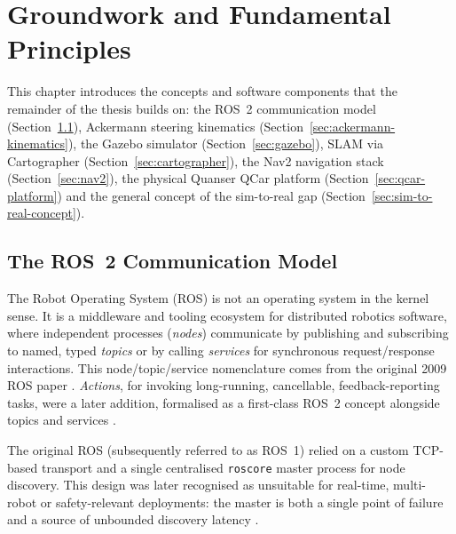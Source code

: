 \chapter{Groundwork and Fundamental Principles}
\label{ch:groundwork}


This chapter introduces the concepts and software components that the
remainder of the thesis builds on: the ROS~2 communication model
(Section~\ref{sec:ros2-model}), Ackermann steering kinematics
(Section~\ref{sec:ackermann-kinematics}), the Gazebo simulator
(Section~\ref{sec:gazebo}), SLAM via Cartographer
(Section~\ref{sec:cartographer}), the Nav2 navigation stack
(Section~\ref{sec:nav2}), the physical Quanser QCar platform
(Section~\ref{sec:qcar-platform}) and the general concept of the
sim-to-real gap (Section~\ref{sec:sim-to-real-concept}).

\section{The ROS~2 Communication Model}
\label{sec:ros2-model}

The Robot Operating System (ROS) is not an operating system in the
kernel sense. It is a middleware and tooling ecosystem for distributed
robotics software, where independent processes (\emph{nodes})
communicate by publishing and subscribing to named, typed
\emph{topics} or by calling \emph{services} for synchronous
request/response interactions. This node/topic/service nomenclature
comes from the original 2009 ROS paper \cite{quigley2009ros}. \emph{Actions},
for invoking long-running, cancellable, feedback-reporting tasks,
were a later addition, formalised as a first-class ROS~2 concept
alongside topics and services \cite{macenski2022ros2}.

The original ROS (subsequently referred to as ROS~1) relied on a
custom TCP-based transport and a single centralised \texttt{roscore}
master process for node discovery. This design was later recognised
as unsuitable for real-time, multi-robot or safety-relevant
deployments: the master is both a single point of failure and a
source of unbounded discovery latency \cite{macenski2022ros2}.

